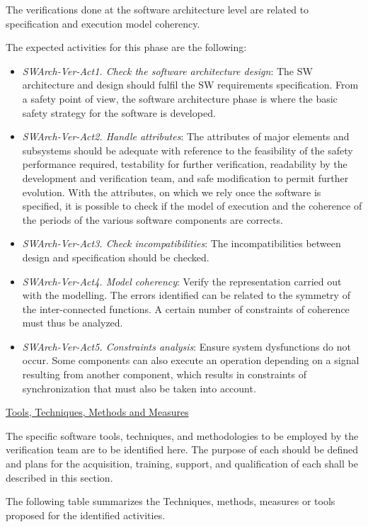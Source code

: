 \documentclass{template/openetcs_report}
\begin{document}
The verifications done at the software architecture level are related to specification and execution model coherency.

The expected activities for this phase are the following:
\begin{itemize}
\item {\it SWArch-Ver-Act1. Check the software architecture design}:
  The SW architecture and design should fulfil the SW requirements
  specification. From a safety point of view, the software
  architecture phase is where the basic safety strategy for the
  software is developed. 
\item {\it SWArch-Ver-Act2. Handle attributes}: The attributes of
  major elements and subsystems should be adequate with reference to
  the feasibility of the safety performance required, testability for
  further verification, readability by the development and
  verification team, and safe modification to permit further
  evolution. With the attributes, on which we rely once the software
  is specified, it is possible to check if the model of execution and
  the coherence of the periods of the various software components are
  corrects. 
\item {\it SWArch-Ver-Act3. Check incompatibilities}: The
  incompatibilities between design and specification should be
  checked.  
\item {\it SWArch-Ver-Act4. Model coherency}: Verify the
  representation carried out with the modelling. The errors identified
  can be related to the symmetry of the inter-connected functions. A
  certain number of constraints of coherence must thus be analyzed.  
\item {\it SWArch-Ver-Act5. Constraints analysis}: Ensure system
  dysfunctions do not occur. Some components can also execute an
  operation depending on a signal resulting from another component,
  which results in constraints of synchronization that must also be
  taken into account.  

\end{itemize}

\underline{Tools, Techniques, Methods and Measures} 

The specific software tools, techniques, and methodologies to be
employed by the verification team are to be identified here. 
The purpose of each should be defined and plans for the acquisition, training, support, and qualification of each shall be described in this section.

The following table summarizes the Techniques, methods, measures or tools proposed for the identified activities.
\end{document}
